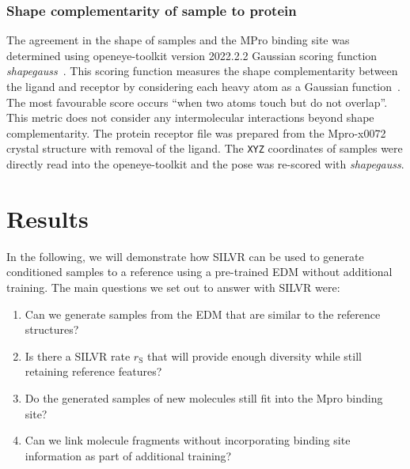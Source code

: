 \documentclass[journal=jacsat,manuscript=article]{achemso}
\begin{document}
\subsubsection{Shape complementarity of sample to protein}
The agreement in the shape of samples and the MPro binding site was determined using openeye-toolkit version 2022.2.2 Gaussian scoring function \textit{shapegauss}~\cite{openeyescientificsoftwareinc.oedocking,kelley2015posit}. This scoring function measures the shape complementarity between the ligand and receptor by considering each heavy atom as a Gaussian function~\cite{mcgann2003gaussian}. The most favourable score occurs “when two atoms touch but do not overlap”.  This metric does not consider any intermolecular interactions beyond shape complementarity. The protein receptor file was prepared from the Mpro-x0072 crystal structure with removal of the ligand. The \texttt{XYZ} coordinates of samples were directly read into the openeye-toolkit and the pose was re-scored with \textit{shapegauss}. 


\section{Results}
In the following, we will demonstrate how SILVR can be used to generate conditioned samples to a reference using a pre-trained EDM without additional training. The main questions we set out to answer with SILVR were:
\begin{enumerate}
    \item Can we generate samples from the EDM that are similar to the reference structures?
    \item Is there a SILVR rate $r_{\mathrm{S}}$ that will provide enough diversity while still retaining reference features?
    \item Do the generated samples of new molecules still fit into the Mpro binding site?
    \item Can we link molecule fragments without incorporating binding site information as part of additional training?
\end{enumerate}
\end{document}
